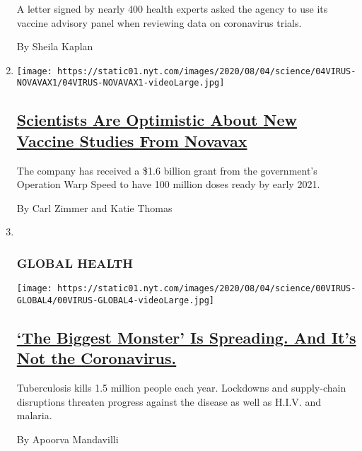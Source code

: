 \begin{enumerate}
  A letter signed by nearly 400 health experts asked the agency to use
  its vaccine advisory panel when reviewing data on coronavirus trials.

  By Sheila Kaplan
\item
  \texttt{[image: https://static01.nyt.com/images/2020/08/04/science/04VIRUS-NOVAVAX1/04VIRUS-NOVAVAX1-videoLarge.jpg]}

  \hypertarget{scientists-are-optimistic-about-new-vaccine-studies-from-novavax}{%
  \subsection{\texorpdfstring{\href{/2020/08/04/health/covid-19-vaccine-novavax.html}{Scientists
  Are Optimistic About New Vaccine Studies From
  Novavax}}{Scientists Are Optimistic About New Vaccine Studies From Novavax}}\label{scientists-are-optimistic-about-new-vaccine-studies-from-novavax}}

  The company has received a \$1.6 billion grant from the government's
  Operation Warp Speed to have 100 million doses ready by early 2021.

  By Carl Zimmer and Katie Thomas
\item ~
  \hypertarget{global-health}{%
  \subsubsection{GLOBAL HEALTH}\label{global-health}}

  \texttt{[image: https://static01.nyt.com/images/2020/08/04/science/00VIRUS-GLOBAL4/00VIRUS-GLOBAL4-videoLarge.jpg]}

  \hypertarget{the-biggest-monster-is-spreading-and-its-not-the-coronavirus}{%
  \subsection{\texorpdfstring{\href{/2020/08/03/health/coronavirus-tuberculosis-aids-malaria.html}{`The
  Biggest Monster' Is Spreading. And It's Not the
  Coronavirus.}}{`The Biggest Monster' Is Spreading. And It's Not the Coronavirus.}}\label{the-biggest-monster-is-spreading-and-its-not-the-coronavirus}}

  Tuberculosis kills 1.5 million people each year. Lockdowns and
  supply-chain disruptions threaten progress against the disease as well
  as H.I.V. and malaria.

  By Apoorva Mandavilli
\end{enumerate}

